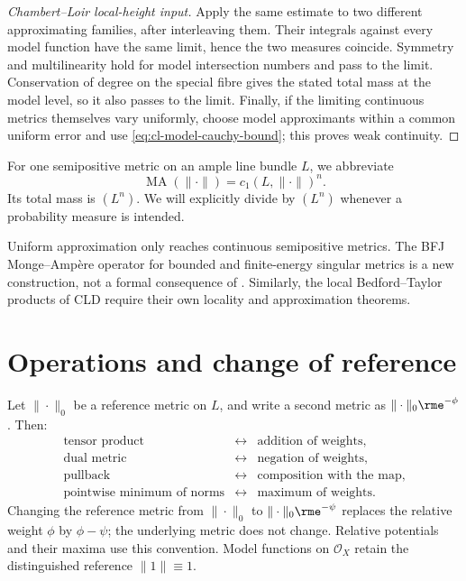 \begin{proof}[Chambert--Loir local-height input]
Apply the same estimate to two different approximating families, after
interleaving them.  Their integrals against every model function have the
same limit, hence the two measures coincide.  Symmetry and multilinearity
hold for model intersection numbers and pass to the limit.  Conservation of
degree on the special fibre gives the stated total mass at the model level,
so it also passes to the limit.  Finally, if the limiting continuous metrics
themselves vary uniformly, choose model approximants within a common uniform
error and use \eqref{eq:cl-model-cauchy-bound}; this proves weak continuity.

\end{proof}

For one semipositive metric on an ample line bundle $L$, we abbreviate
\[
               \operatorname{MA}(\|\cdot\|)
               =c_1(L,\|\cdot\|)^n.
\]
Its total mass is $(L^n)$. We will explicitly divide by $(L^n)$ whenever
a probability measure is intended.

\begin{remark}
\label{rem:metrics-singular-theory-boundary}
Uniform approximation only reaches continuous semipositive metrics. The BFJ
Monge--Amp\`ere operator for bounded and finite-energy singular metrics is a
new construction, not a formal consequence of
. Similarly, the local
Bedford--Taylor products of CLD require their own locality and approximation
theorems.
\end{remark}

\section{Operations and change of reference}
\label{sec:metrics-operations}

Let $\|\cdot\|_0$ be a reference metric on $L$, and write a second metric
as $\|\cdot\|_0\rme^{-\phi}$. Then:
\[
\begin{array}{ccl}
\text{tensor product} &\longleftrightarrow& \text{addition of weights},\\
\text{dual metric} &\longleftrightarrow& \text{negation of weights},\\
\text{pullback} &\longleftrightarrow& \text{composition with the map},\\
\text{pointwise minimum of norms}
  &\longleftrightarrow& \text{maximum of weights}.
\end{array}
\]
Changing the reference metric from $\|\cdot\|_0$ to
$\|\cdot\|_0\rme^{-\psi}$ replaces the relative weight $\phi$ by
$\phi-\psi$; the underlying metric does not change. Relative potentials
and their maxima use this convention. Model functions on $\mathcal O_X$
retain the distinguished reference $\|1\|\equiv1$.

